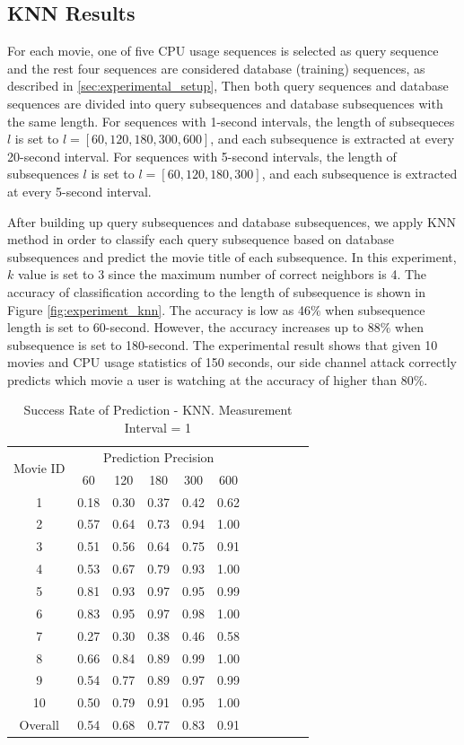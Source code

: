 \subsection{KNN Results}

For each movie, one of five CPU usage sequences is selected as query sequence and the rest four sequences are considered database (training) sequences, as described in \ref{sec:experimental_setup}, 
Then both query sequences and database sequences are divided into query subsequences and database subsequences with the same length.
For sequences with 1-second intervals, the length of subsequeces $l$ is set to $l = [60, 120, 180, 300, 600]$, and each subsequence is extracted at every 20-second interval. 
For sequences with 5-second intervals, the length of subsequences $l$ is set to $l = [60, 120, 180, 300]$, and each subsequence is extracted at every 5-second interval. 

After building up query subsequences and database subsequences, we apply KNN method in order to classify each query subsequence based on database subsequences and predict the movie title of each subsequence. 
In this experiment, $k$ value is set to 3 since the maximum number of correct neighbors is 4. 
The accuracy of classification according to the length of subsequence is shown in Figure \ref{fig:experiment_knn}.
The accuracy is low as 46$\%$ when subsequence length is set to 60-second.
However, the accuracy increases up to 88$\%$ when subsequence is set to 180-second.
The experimental result shows that given 10 movies and CPU usage statistics of 150 seconds, our side channel attack correctly predicts which movie a user is watching at the accuracy of higher than 80$\%$.

\begin{table}[h!]
\begin{center}
\begin{tabular}{|c||c|c|c|c|c|c|c|c|c|c|}
\hline
\multirow{2}{*}{Movie ID} & \multicolumn{5}{c|}{Prediction Precision}	\\
\cline{2-6}
	& 60 & 120 & 180 & 300 & 600		\\
\hline
1	& 0.18	& 0.30	& 0.37	& 0.42	& 0.62		\\
2 	& 0.57	& 0.64	& 0.73	& 0.94	& 1.00		\\
3 	& 0.51	& 0.56	& 0.64	& 0.75	& 0.91		\\
4	& 0.53	& 0.67	& 0.79	& 0.93	& 1.00		\\
5	& 0.81	& 0.93	& 0.97	& 0.95	& 0.99		\\
6	& 0.83	& 0.95	& 0.97	& 0.98	& 1.00		\\
7 	& 0.27	& 0.30	& 0.38	& 0.46	& 0.58		\\
8 	& 0.66	& 0.84	& 0.89	& 0.99	& 1.00		\\
9 	& 0.54	& 0.77	& 0.89	& 0.97	& 0.99		\\
10 	& 0.50	& 0.79	& 0.91	& 0.95	& 1.00		\\	
\hline
\hline
Overall & 0.54	& 0.68	& 0.77	& 0.83	& 0.91	 	\\
\hline
\end{tabular}
\end{center}
\caption{Success Rate of Prediction - KNN. Measurement Interval = 1}
\label{tab:knn_interval1}
\end{table}

